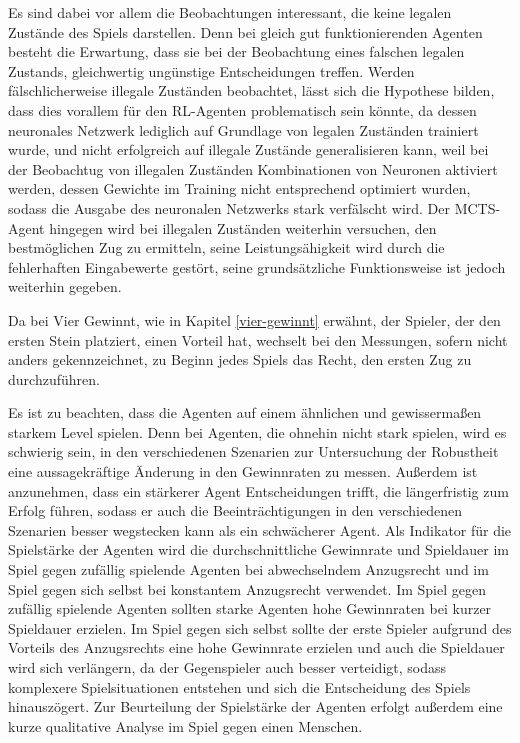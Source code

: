 Es sind dabei vor allem die Beobachtungen interessant, die keine legalen Zustände des Spiels darstellen. Denn bei gleich gut funktionierenden Agenten besteht die Erwartung, dass sie bei der Beobachtung eines falschen legalen Zustands, gleichwertig ungünstige Entscheidungen treffen. Werden fälschlicherweise illegale Zuständen beobachtet, lässt sich die Hypothese bilden, dass dies vorallem für den RL-Agenten problematisch sein könnte, da dessen neuronales Netzwerk lediglich auf Grundlage von legalen Zuständen trainiert wurde, und nicht erfolgreich auf illegale Zustände generalisieren kann, weil bei der Beobachtug von illegalen Zuständen Kombinationen von Neuronen aktiviert werden, dessen Gewichte im Training nicht entsprechend optimiert wurden, sodass die Ausgabe des neuronalen Netzwerks stark verfälscht wird. Der MCTS-Agent hingegen wird bei illegalen Zuständen weiterhin versuchen, den bestmöglichen Zug zu ermitteln, seine Leistungsähigkeit wird durch die fehlerhaften Eingabewerte gestört, seine grundsätzliche Funktionsweise ist jedoch weiterhin gegeben.

Da bei Vier Gewinnt, wie in Kapitel \ref{vier-gewinnt} erwähnt, der Spieler, der den ersten Stein platziert, einen Vorteil hat, wechselt bei den Messungen, sofern nicht anders gekennzeichnet, zu Beginn jedes Spiels das Recht, den ersten Zug zu durchzuführen.

Es ist zu beachten, dass die Agenten auf einem ähnlichen und gewissermaßen starkem Level spielen. Denn bei Agenten, die ohnehin nicht stark spielen, wird es schwierig sein, in den verschiedenen Szenarien zur Untersuchung der Robustheit eine aussagekräftige Änderung in den Gewinnraten zu messen. Außerdem ist anzunehmen, dass ein stärkerer Agent Entscheidungen trifft, die längerfristig zum Erfolg führen, sodass er auch die Beeinträchtigungen in den verschiedenen Szenarien besser wegstecken kann als ein schwächerer Agent. Als Indikator für die Spielstärke der Agenten wird die durchschnittliche Gewinnrate und Spieldauer im Spiel gegen zufällig spielende Agenten bei abwechselndem Anzugsrecht und im Spiel gegen sich selbst bei konstantem Anzugsrecht verwendet. Im Spiel gegen zufällig spielende Agenten sollten starke Agenten hohe Gewinnraten bei kurzer Spieldauer erzielen. Im Spiel gegen sich selbst sollte der erste Spieler aufgrund des Vorteils des Anzugsrechts eine hohe Gewinnrate erzielen und auch die Spieldauer wird sich verlängern, da der Gegenspieler auch besser verteidigt, sodass komplexere Spielsituationen entstehen und sich die Entscheidung des Spiels hinauszögert. Zur Beurteilung der Spielstärke der Agenten erfolgt außerdem eine kurze qualitative Analyse im Spiel gegen einen Menschen.
